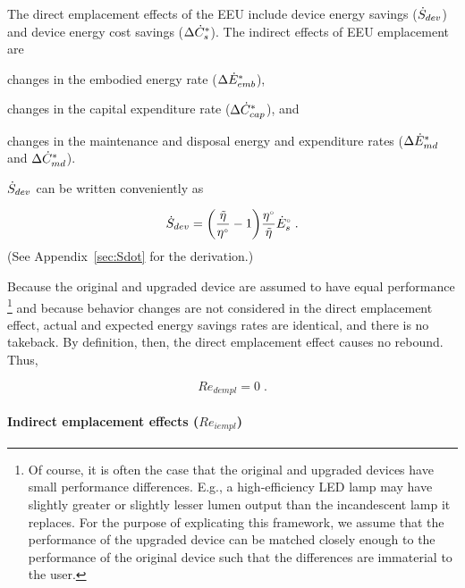 \documentclass[12pt]{article}\usepackage[]{graphicx}\usepackage[]{xcolor}
\begin{document}
The direct emplacement effects of the EEU include
device energy savings ($\dot{S}_{dev}$) and device energy cost savings ($\Delta {\dot{C}}^*_s$).
The indirect effects of EEU emplacement are
%
\begin{enumerate*}[label={(\roman*)}]
	
  \item changes in the embodied energy rate ($\Delta {\dot{E}}^*_{emb}$), 
  
  \item changes in the capital expenditure rate ($\Delta {\dot{C}}^*_{cap}$), and 
        
  \item changes in the maintenance and disposal energy and expenditure rates 
        ($\Delta {\dot{E}}^*_{md}$ and $\Delta {\dot{C}}^*_{md}$).
    
\end{enumerate*}
%
$\dot{S}_{dev}$ can be written conveniently as

\begin{equation} \label{eq:Sdot}
  \dot{S}_{dev} = \left( \frac{\tilde{\eta}}{{}{\eta}^{\scriptscriptstyle \circ}} - 1 \right)\! \frac{{}{\eta}^{\scriptscriptstyle \circ}}{\tilde{\eta}} {}{\dot{E}}^{\scriptscriptstyle \circ}_s \; .
\end{equation}
%
(See Appendix~\ref{sec:Sdot} for the derivation.)

Because the original and upgraded device are assumed to 
have equal performance%
\footnote{
  Of course, it is often the case that the original and upgraded devices
  have small performance differences. 
  E.g., a high-efficiency LED lamp may have slightly greater or slightly lesser 
  lumen output than the incandescent lamp it replaces. 
  For the purpose of explicating this framework,
  we assume that the performance of the upgraded device can be matched closely enough
  to the performance of the original device 
  such that the differences are immaterial to the user.
}
%
and because
behavior changes are not considered in the direct emplacement effect,
actual and expected energy savings rates are identical, and
there is no takeback.
By definition, then, the direct emplacement effect causes no rebound.
Thus, 

\begin{equation} \label{eq:Re_dempl0}
  Re_{dempl} = 0 \; .
\end{equation}


\paragraph{Indirect emplacement effects ($Re_{iempl}$)} 
\end{document}
